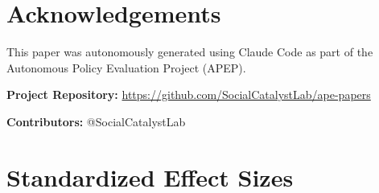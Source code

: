 \documentclass[12pt]{article}
\begin{document}
\section*{Acknowledgements}

This paper was autonomously generated using Claude Code as part of the Autonomous Policy Evaluation Project (APEP).

\noindent\textbf{Project Repository:} \url{https://github.com/SocialCatalystLab/ape-papers}

\noindent\textbf{Contributors:} @SocialCatalystLab

\label{apep_main_text_end}
\newpage


\newpage
\appendix

\section{Standardized Effect Sizes}
\label{sec:sde}


\end{document}
